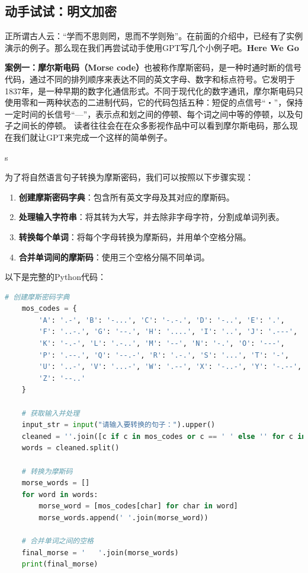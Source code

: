 \subsection{动手试试：明文加密}

正所谓古人云：``学而不思则罔，思而不学则殆''。在前面的介绍中，已经有了实例演示的例子。那么现在我们再尝试动手使用GPT写几个小例子吧。\textbf{Here We Go}

\textbf{案例一：摩尔斯电码（Morse code）}也被称作摩斯密码，是一种时通时断的信号代码，通过不同的排列顺序来表达不同的英文字母、数字和标点符号。它发明于1837年，是一种早期的数字化通信形式。不同于现代化的数字通讯，摩尔斯电码只使用零和一两种状态的二进制代码，它的代码包括五种：短促的点信号``・''，保持一定时间的长信号``---''，表示点和划之间的停顿、每个词之间中等的停顿，以及句子之间长的停顿。
读者往往会在在众多影视作品中可以看到摩尔斯电码，那么现在我们就让GPT来完成一个这样的简单例子。


\begin{gptbox}
s \footnotesize{
为了将自然语言句子转换为摩斯密码，我们可以按照以下步骤实现：

\begin{enumerate}
  \def\labelenumi{\arabic{enumi}.}
  \item
        \textbf{创建摩斯密码字典}：包含所有英文字母及其对应的摩斯码。
  \item
        \textbf{处理输入字符串}：将其转为大写，并去除非字母字符，分割成单词列表。
  \item
        \textbf{转换每个单词}：将每个字母转换为摩斯码，并用单个空格分隔。
  \item
        \textbf{合并单词间的摩斯码}：使用三个空格分隔不同单词。
\end{enumerate}
以下是完整的Python代码：
}
\small{
\begin{lstlisting}[language=Python]
    # 创建摩斯密码字典
    mos_codes = {
        'A': '.-', 'B': '-...', 'C': '-.-.', 'D': '-..', 'E': '.', 
        'F': '..-.', 'G': '--.', 'H': '....', 'I': '..', 'J': '.---', 
        'K': '-.-', 'L': '.-..', 'M': '--', 'N': '-.', 'O': '---', 
        'P': '.--.', 'Q': '--.-', 'R': '.-.', 'S': '...', 'T': '-', 
        'U': '..-', 'V': '...-', 'W': '.--', 'X': '-..-', 'Y': '-.--', 
        'Z': '--..'
    }
    
    # 获取输入并处理
    input_str = input("请输入要转换的句子：").upper()
    cleaned = ''.join([c if c in mos_codes or c == ' ' else '' for c in input_str])
    words = cleaned.split()
    
    # 转换为摩斯码
    morse_words = []
    for word in words:
        morse_word = [mos_codes[char] for char in word]
        morse_words.append(' '.join(morse_word))
    
    # 合并单词之间的空格
    final_morse = '   '.join(morse_words)
    print(final_morse)
\end{lstlisting}
}
\end{gptbox}

